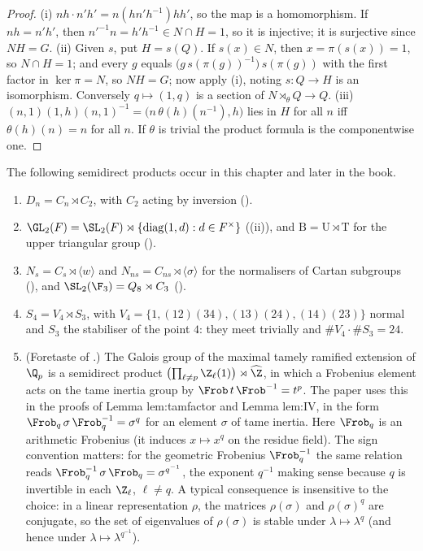\begin{proof}
(i) $nh\cdot n'h'=n(hn'h^{-1})hh'$, so the map is a homomorphism. If $nh=n'h'$, then $n'^{-1}n=h'h^{-1}\in N\cap H=1$, so it is injective; it is
surjective since $NH=G$. (ii) Given $s$, put $H=s(Q)$. If $s(x)\in N$, then $x=\pi(s(x))=1$, so $N\cap H=1$; and every $g$ equals
$\bigl(g\,s(\pi(g))^{-1}\bigr)\,s(\pi(g))$ with the first factor in $\ker\pi=N$, so $NH=G$; now apply (i), noting $s\colon Q\to H$ is an isomorphism.
Conversely $q\mapsto(1,q)$ is a section of $N\rtimes_\theta Q\to Q$. (iii) $(n,1)(1,h)(n,1)^{-1}=\bigl(n\,\theta(h)(n^{-1}),h\bigr)$ lies in $H$ for all $n$
iff $\theta(h)(n)=n$ for all $n$. If $\theta$ is trivial the product formula is the componentwise one.
\end{proof}

\begin{example}\label{ex:groups:semidirectexamples}
The following semidirect products occur in this chapter and later in the book.
\begin{enumerate}[label=(\alph*)]
\item $D_n=C_n\rtimes C_2$, with $C_2$ acting by inversion ().
\item $\GL_2(F)=\SL_2(F)\rtimes\{\mathrm{diag}(1,d):d\in F^\times\}$ ((ii)), and $\mathrm B=\mathrm U\rtimes\mathrm T$ for the upper
triangular group ().
\item $N_s=C_s\rtimes\langle w\rangle$ and $N_{ns}=C_{ns}\rtimes\langle\sigma\rangle$ for the normalisers of Cartan subgroups (), and
$\SL_2(\F_3)=Q_8\rtimes C_3$ ().
\item $S_4=V_4\rtimes S_3$, with $V_4=\{1,(12)(34),(13)(24),(14)(23)\}$ normal and $S_3$ the stabiliser of the point $4$: they meet trivially and
$\#V_4\cdot\#S_3=24$.
\item (Foretaste of .) The Galois group of the maximal tamely ramified extension of $\Q_p$ is a semidirect product
$\bigl(\prod_{\ell\ne p}\Z_\ell(1)\bigr)\rtimes\widehat\Z$, in which a Frobenius element acts on the tame inertia group by
$\Frob\,t\,\Frob^{-1}=t^p$. The paper uses this in the proofs of Lemma lem:tamfactor and Lemma lem:IV, in the form
$\Frob_q\,\sigma\,\Frob_q^{-1}=\sigma^q$ for an element $\sigma$ of tame inertia. Here $\Frob_q$ is an arithmetic Frobenius (it induces $x\mapsto x^q$ on the
residue field). The sign convention matters: for the geometric Frobenius $\Frob_q^{-1}$ the same relation reads $\Frob_q^{-1}\,\sigma\,\Frob_q=\sigma^{q^{-1}}$, the
exponent $q^{-1}$ making sense because $q$ is invertible in each $\Z_\ell$, $\ell\ne q$. A typical consequence is insensitive to the choice: in a linear
representation $\rho$, the matrices $\rho(\sigma)$ and $\rho(\sigma)^q$ are conjugate, so the set of eigenvalues of $\rho(\sigma)$ is stable under $\lambda\mapsto\lambda^q$ (and
hence under $\lambda\mapsto\lambda^{q^{-1}}$).
\end{enumerate}
\end{example}


